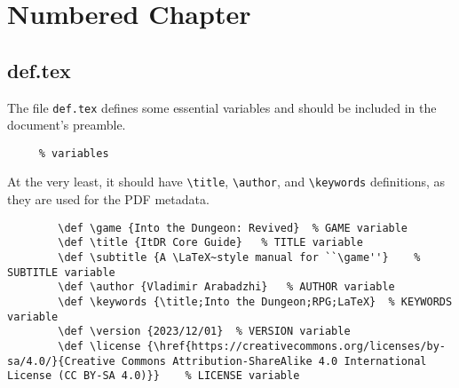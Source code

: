 \documentclass[itdr]{subfiles}
\begin{document}
\chapter{Numbered Chapter}
\label{ch:numbered}

\section{def.tex}

The file \lstinline!def.tex! defines some essential variables and should be included in the document's preamble.

\begin{lstlisting}
	 % variables
\end{lstlisting}

At the very least, it should have \lstinline!\title!, \lstinline!\author!, and \lstinline!\keywords! definitions, as they are used for the PDF metadata.

\vspace{\baselineskip}
\noindent\begin{minipage}{\textwidth}
	\begin{lstlisting}
		\def \game {Into the Dungeon: Revived}	% GAME variable
		\def \title {ItDR Core Guide}	% TITLE variable
		\def \subtitle {A \LaTeX~style manual for ``\game''}	% SUBTITLE variable
		\def \author {Vladimir Arabadzhi}	% AUTHOR variable
		\def \keywords {\title;Into the Dungeon;RPG;LaTeX}	% KEYWORDS variable
		\def \version {2023/12/01}	% VERSION variable
		\def \license {\href{https://creativecommons.org/licenses/by-sa/4.0/}{Creative Commons Attribution-ShareAlike 4.0 International License (CC BY-SA 4.0)}}	% LICENSE variable
	\end{lstlisting}
\end{minipage}

\vfill
\end{document}
